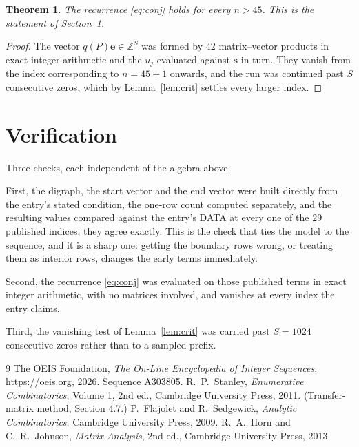\documentclass[11pt,a4paper]{article}
\theoremstyle{plain}
\newtheorem{theorem}{Theorem}
\theoremstyle{definition}
\begin{document}
\begin{theorem}
The recurrence \eqref{eq:conj} holds for every $n>45$. This is the statement of
Section~1.
\end{theorem}

\begin{proof}
The vector $q(P)\mathbf{e}\in\mathbb{Z}^{S}$ was formed by $42$ matrix--vector
products in exact integer arithmetic and the $u_j$ evaluated against $\mathbf{s}$ in turn.
They vanish from the index corresponding to $n=45+1$ onwards, and the run was continued
past $S$ consecutive zeros, which by Lemma~\ref{lem:crit} settles every larger index.
\end{proof}

\section{Verification}

Three checks, each independent of the algebra above.

First, the digraph, the start vector and the end vector were built directly from the
entry's stated condition, the one-row count computed separately, and the resulting values
compared against the entry's DATA at every one of the $29$ published indices; they
agree exactly. This is the check that ties the model to the sequence, and it is a sharp one:
getting the boundary rows wrong, or treating them as interior rows, changes the early terms
immediately.

Second, the recurrence \eqref{eq:conj} was evaluated on those published terms in exact
integer arithmetic, with no matrices involved, and vanishes at every index the entry claims.

Third, the vanishing test of Lemma~\ref{lem:crit} was carried past $S=1024$ consecutive
zeros rather than to a sampled prefix.

\begin{thebibliography}{9}
 The OEIS Foundation, \emph{The On-Line Encyclopedia of Integer
Sequences}, \url{https://oeis.org}, 2026. Sequence A303805.
 R.~P.~Stanley, \emph{Enumerative Combinatorics}, Volume 1, 2nd ed.,
Cambridge University Press, 2011. (Transfer-matrix method, Section 4.7.)
 P.~Flajolet and R.~Sedgewick, \emph{Analytic Combinatorics}, Cambridge
University Press, 2009.
 R.~A.~Horn and C.~R.~Johnson, \emph{Matrix Analysis}, 2nd ed., Cambridge
University Press, 2013.
\end{thebibliography}
\end{document}

